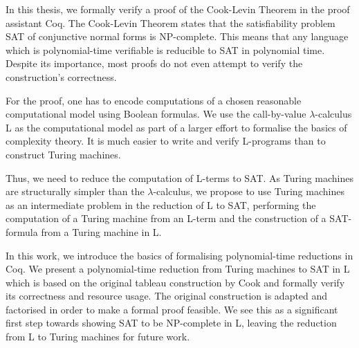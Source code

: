 In this thesis, we formally verify a proof of the Cook-Levin Theorem in the proof assistant Coq.
The Cook-Levin Theorem states that the satisfiability problem SAT of conjunctive normal forms is NP-complete. 
This means that any language which is polynomial-time verifiable is reducible to SAT in polynomial time. 
Despite its importance, most proofs do not even attempt to verify the construction's correctness.


For the proof, one has to encode computations of a chosen reasonable computational model using Boolean formulas. 
We use the call-by-value $\lambda$-calculus L as the computational model as part of a larger effort to formalise the basics of complexity theory. 
It is much easier to write and verify L-programs than to construct Turing machines.

Thus, we need to reduce the computation of L-terms to SAT\@.
As Turing machines are structurally simpler than the $\lambda$-calculus, we propose to use Turing machines as an intermediate problem in the reduction of L to SAT, performing the computation of a Turing machine from an L-term and the construction of a SAT-formula from a Turing machine in L.

In this work, we introduce the basics of formalising polynomial-time reductions in Coq. We present a polynomial-time reduction from Turing machines to SAT in L which is based on the original tableau construction by Cook and formally verify its correctness and resource usage. The original construction is adapted and factorised in order to make a formal proof feasible. We see this as a significant first step towards showing SAT to be NP-complete in L, leaving the reduction from L to Turing machines for future work.
